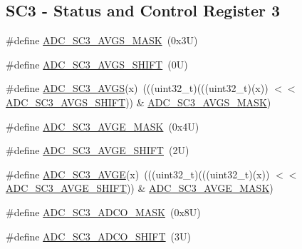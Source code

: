 \subsection*{S\+C3 -\/ Status and Control Register 3}
\begin{DoxyCompactItemize}
\item 
\#define \mbox{\hyperlink{group___a_d_c___register___masks_ga677b69b096f22ecc80fff1a789d3c48d}{A\+D\+C\+\_\+\+S\+C3\+\_\+\+A\+V\+G\+S\+\_\+\+M\+A\+SK}}~(0x3\+U)
\item 
\#define \mbox{\hyperlink{group___a_d_c___register___masks_gad00e65ae5553df8fbeef6430a61d2f74}{A\+D\+C\+\_\+\+S\+C3\+\_\+\+A\+V\+G\+S\+\_\+\+S\+H\+I\+FT}}~(0\+U)
\item 
\#define \mbox{\hyperlink{group___a_d_c___register___masks_gac693b130e0a9400fe61d0a23f5d59780}{A\+D\+C\+\_\+\+S\+C3\+\_\+\+A\+V\+GS}}(x)~(((uint32\+\_\+t)(((uint32\+\_\+t)(x)) $<$$<$ \mbox{\hyperlink{group___a_d_c___register___masks_gad00e65ae5553df8fbeef6430a61d2f74}{A\+D\+C\+\_\+\+S\+C3\+\_\+\+A\+V\+G\+S\+\_\+\+S\+H\+I\+FT}})) \& \mbox{\hyperlink{group___a_d_c___register___masks_ga677b69b096f22ecc80fff1a789d3c48d}{A\+D\+C\+\_\+\+S\+C3\+\_\+\+A\+V\+G\+S\+\_\+\+M\+A\+SK}})
\item 
\#define \mbox{\hyperlink{group___a_d_c___register___masks_gafcb3a8cfe1a126545673ddcf733b74da}{A\+D\+C\+\_\+\+S\+C3\+\_\+\+A\+V\+G\+E\+\_\+\+M\+A\+SK}}~(0x4\+U)
\item 
\#define \mbox{\hyperlink{group___a_d_c___register___masks_ga56d9621785ea853cf450f1b06d15e1d5}{A\+D\+C\+\_\+\+S\+C3\+\_\+\+A\+V\+G\+E\+\_\+\+S\+H\+I\+FT}}~(2\+U)
\item 
\#define \mbox{\hyperlink{group___a_d_c___register___masks_ga85f16b549c4fb29fb7e24ab525fdca12}{A\+D\+C\+\_\+\+S\+C3\+\_\+\+A\+V\+GE}}(x)~(((uint32\+\_\+t)(((uint32\+\_\+t)(x)) $<$$<$ \mbox{\hyperlink{group___a_d_c___register___masks_ga56d9621785ea853cf450f1b06d15e1d5}{A\+D\+C\+\_\+\+S\+C3\+\_\+\+A\+V\+G\+E\+\_\+\+S\+H\+I\+FT}})) \& \mbox{\hyperlink{group___a_d_c___register___masks_gafcb3a8cfe1a126545673ddcf733b74da}{A\+D\+C\+\_\+\+S\+C3\+\_\+\+A\+V\+G\+E\+\_\+\+M\+A\+SK}})
\item 
\#define \mbox{\hyperlink{group___a_d_c___register___masks_ga9054cd805b818a928ca4309c717466db}{A\+D\+C\+\_\+\+S\+C3\+\_\+\+A\+D\+C\+O\+\_\+\+M\+A\+SK}}~(0x8\+U)
\item 
\#define \mbox{\hyperlink{group___a_d_c___register___masks_ga8e5f5e3a1378880d2a03d1662f39c308}{A\+D\+C\+\_\+\+S\+C3\+\_\+\+A\+D\+C\+O\+\_\+\+S\+H\+I\+FT}}~(3\+U)
\item 

\end{DoxyCompactItemize}
